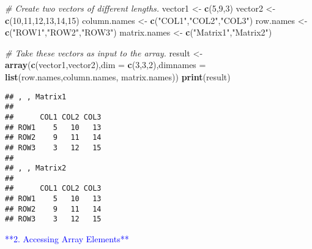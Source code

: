 \documentclass[
]{article}
\newenvironment{Shaded}{\begin{snugshade}}{\end{snugshade}}
\newcommand{\AttributeTok}[1]{\textcolor[rgb]{0.13,0.29,0.53}{#1}}
\newcommand{\CommentTok}[1]{\textcolor[rgb]{0.56,0.35,0.01}{\textit{#1}}}
\newcommand{\DecValTok}[1]{\textcolor[rgb]{0.00,0.00,0.81}{#1}}
\newcommand{\FunctionTok}[1]{\textcolor[rgb]{0.13,0.29,0.53}{\textbf{#1}}}
\newcommand{\NormalTok}[1]{#1}
\newcommand{\OtherTok}[1]{\textcolor[rgb]{0.56,0.35,0.01}{#1}}
\newcommand{\StringTok}[1]{\textcolor[rgb]{0.31,0.60,0.02}{#1}}
\begin{document}
\begin{Shaded}
\begin{Highlighting}[]
\CommentTok{\# Create two vectors of different lengths.}
\NormalTok{vector1 }\OtherTok{\textless{}{-}} \FunctionTok{c}\NormalTok{(}\DecValTok{5}\NormalTok{,}\DecValTok{9}\NormalTok{,}\DecValTok{3}\NormalTok{)}
\NormalTok{vector2 }\OtherTok{\textless{}{-}} \FunctionTok{c}\NormalTok{(}\DecValTok{10}\NormalTok{,}\DecValTok{11}\NormalTok{,}\DecValTok{12}\NormalTok{,}\DecValTok{13}\NormalTok{,}\DecValTok{14}\NormalTok{,}\DecValTok{15}\NormalTok{)}
\NormalTok{column.names }\OtherTok{\textless{}{-}} \FunctionTok{c}\NormalTok{(}\StringTok{"COL1"}\NormalTok{,}\StringTok{"COL2"}\NormalTok{,}\StringTok{"COL3"}\NormalTok{)}
\NormalTok{row.names }\OtherTok{\textless{}{-}} \FunctionTok{c}\NormalTok{(}\StringTok{"ROW1"}\NormalTok{,}\StringTok{"ROW2"}\NormalTok{,}\StringTok{"ROW3"}\NormalTok{)}
\NormalTok{matrix.names }\OtherTok{\textless{}{-}} \FunctionTok{c}\NormalTok{(}\StringTok{"Matrix1"}\NormalTok{,}\StringTok{"Matrix2"}\NormalTok{)}

\CommentTok{\# Take these vectors as input to the array.}
\NormalTok{result }\OtherTok{\textless{}{-}} \FunctionTok{array}\NormalTok{(}\FunctionTok{c}\NormalTok{(vector1,vector2),}\AttributeTok{dim =} \FunctionTok{c}\NormalTok{(}\DecValTok{3}\NormalTok{,}\DecValTok{3}\NormalTok{,}\DecValTok{2}\NormalTok{),}\AttributeTok{dimnames =} \FunctionTok{list}\NormalTok{(row.names,column.names,}
\NormalTok{   matrix.names))}
\FunctionTok{print}\NormalTok{(result)}
\end{Highlighting}
\end{Shaded}

\begin{verbatim}
## , , Matrix1
## 
##      COL1 COL2 COL3
## ROW1    5   10   13
## ROW2    9   11   14
## ROW3    3   12   15
## 
## , , Matrix2
## 
##      COL1 COL2 COL3
## ROW1    5   10   13
## ROW2    9   11   14
## ROW3    3   12   15
\end{verbatim}

\textcolor{blue}{**2. Accessing Array Elements**}
\end{document}
